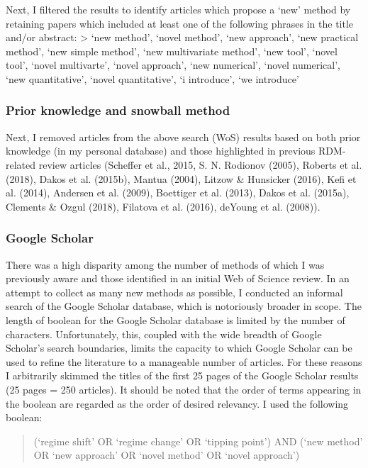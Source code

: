 \documentclass[12pt,twoside,openany]{reedthesis}
\begin{document}
Next, I filtered the results to identify articles which propose a `new'
method by retaining papers which included at least one of the following
phrases in the title and/or abstract: \textgreater{} `new method',
`novel method', `new approach', `new practical method', `new simple
method', `new multivariate method', `new tool', `novel tool', `novel
multivarte', `novel approach', `new numerical', `novel numerical', `new
quantitative', `novel quantitative', `i introduce', `we introduce'

\subsubsection{Prior knowledge and snowball
method}\label{prior-knowledge-and-snowball-method}

Next, I removed articles from the above search (WoS) results based on
both prior knowledge (in my personal database) and those highlighted in
previous RDM-related review articles (Scheffer et al., 2015, S. N.
Rodionov (2005), Roberts et al. (2018), Dakos et al. (2015b), Mantua
(2004), Litzow \& Hunsicker (2016), Kefi et al. (2014), Andersen et al.
(2009), Boettiger et al. (2013), Dakos et al. (2015a), Clements \& Ozgul
(2018), Filatova et al. (2016), deYoung et al. (2008)).

\subsubsection{Google Scholar}\label{google-scholar}

There was a high disparity among the number of methods of which I was
previously aware and those identified in an initial Web of Science
review. In an attempt to collect as many new methods as possible, I
conducted an informal search of the Google Scholar database, which is
notoriously broader in scope. The length of boolean for the Google
Scholar database is limited by the number of characters. Unfortunately,
this, coupled with the wide breadth of Google Scholar's search
boundaries, limits the capacity to which Google Scholar can be used to
refine the literature to a manageable number of articles. For these
reasons I arbitrarily skimmed the titles of the first 25 pages of the
Google Scholar results (25 pages = 250 articles). It should be noted
that the order of terms appearing in the boolean are regarded as the
order of desired relevancy. I used the following boolean:
\begin{quote}
(`regime shift' OR `regime change' OR `tipping point') AND (`new method'
OR `new approach' OR `novel method' OR `novel approach')
\end{quote}
\end{document}
